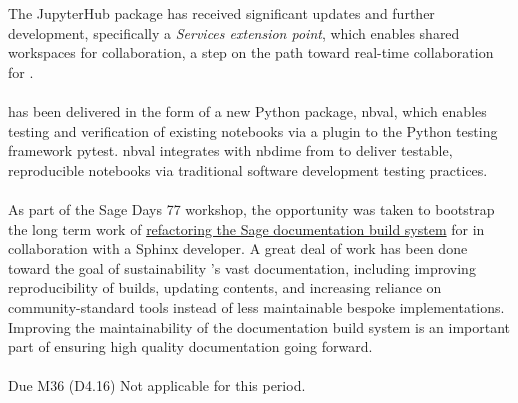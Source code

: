 \documentclass{deliverablereport}
\begin{document}
The JupyterHub package has received significant updates and further development, specifically a
\emph{Services extension point}, which enables shared workspaces for collaboration, a step on the path
toward real-time collaboration for .

\paragraph{}

 has been delivered in the form of a new Python package, nbval,
which enables testing and verification of existing notebooks via a plugin to the Python testing
framework pytest. nbval integrates with nbdime from  to deliver
testable, reproducible notebooks via traditional software development testing practices.


\paragraph{}

As part of the Sage Days 77 workshop, the opportunity was taken to bootstrap the long term work of
\href{https://wiki.sagemath.org/days77/documentation}{refactoring the Sage documentation build
system} for  in collaboration with a Sphinx developer. A great deal
of work has been done toward the goal of sustainability \Sage's vast documentation, including
improving reproducibility of builds, updating contents, and increasing reliance on
community-standard tools instead of less maintainable bespoke
implementations. Improving the maintainability of the \Sage
documentation build system is an important part of ensuring high quality documentation going forward.

\paragraph{} Due M36 (D4.16)
Not applicable for this period.

\paragraph{}
\end{document}
